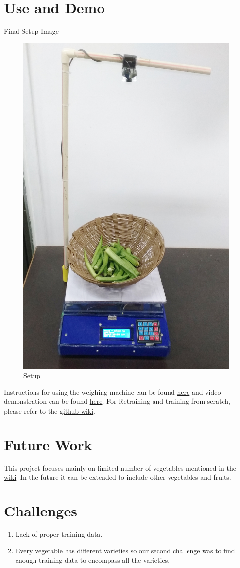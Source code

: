 \documentclass[a4paper,12pt,oneside]{book}
\begin{document}
\section{Use and Demo}
Final Setup Image
\begin{figure}[!ht]
	\centering
	\includegraphics[width=0.4\linewidth]{setup.jpg}
	\caption{Setup}
	\label{fig:setup}
\end{figure}


Instructions for using the weighing machine can be found \href{https://github.com/eYSIP-2017/eYSIP-2017_Vegetable-Identification-Using-Transfer-Learning/tree/master/Documentation/Manuals}{here} and video demonstration can be found \href{https://www.youtube.com/watch?v=pK54FPOAd_Q}{here}.
For Retraining and training from scratch, please refer to the \href{https://github.com/eYSIP-2017/eYSIP-2017_Vegetable-Identification-Using-Transfer-Learning/wiki}{github wiki}.

 

\section{Future Work}
This project focuses mainly on limited number of vegetables mentioned in the \href{https://github.com/eYSIP-2017/eYSIP-2017_Vegetable-Identification-Using-Transfer-Learning/wiki/List-of-Vegetables}{wiki}. In the future it can be extended to include other vegetables and fruits.

\section{Challenges}
\begin{enumerate}
	\item Lack of proper training data.
	\item Every vegetable has different varieties so our second challenge was to find enough training data to encompass all the varieties.
\end{enumerate}
\end{document}

